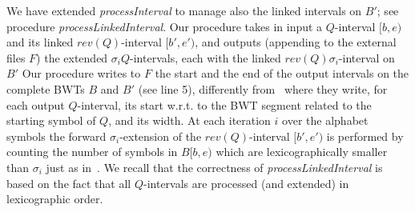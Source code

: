 \documentclass[runningheads,envcountsame,a4paper]{llncs}
\newcommand{\notaestesa}[2]{%
 \marginpar{\color{red!75!black}\textbf{\texttimes}}%
 {\color{red!75!black}%
 [\,\textbullet\,\textsf{\textbf{#1:}} %
 \textsf{\footnotesize#2}\,\textbullet\,]}%
}
\newcommand{\wrt}{w.r.t.\xspace}
\begin{document}
We have extended \emph{processInterval} to manage also the linked intervals on
$B'$; see procedure \emph{processLinkedInterval}.
Our procedure takes in input a $Q$-interval $[b,e)$ and its linked
$rev(Q)$-interval $[b',e')$, and outputs (appending to the external files $F$)
the extended $\sigma_i Q$-intervals, each  with the linked $rev(Q)
\sigma_i$-interval on $B'$
Our procedure writes to $F$ the start and the end of the output intervals on the
complete BWTs $B$ and $B'$ (see line 5), differently from~\cite{Cox2012} where they write, for each output $Q$-interval, its start \wrt to the BWT segment related to the starting symbol of $Q$, and its width.
At each iteration $i$ over the alphabet symbols the forward $\sigma_i$-extension
of the $rev(Q)$-interval $[b',e')$ is performed by counting
the number of symbols in $B[b,e)$ which are lexicographically smaller than
$\sigma_i$ just as in~\cite{Simpson2010}.
We recall that the correctness of \emph{processLinkedInterval} is based on the
fact that all $Q$-intervals are processed (and extended) in lexicographic order.








\begin{comment}
More precisely, the steps .... in algorithm \emph{processLinkedInterval}
directly provides the values of the new $\sigma Q$-interval and such
value is appended at the end of the new updated list (or file), in order
to maintain the lexicographic ordering.
In fact, the sorted property of the file, allows to update the files
while reading the files themselves, thus minimizing the operations on the
file.
\notaestesa{PB}{nota bene il passo dal 3 al 9 non si capisce come sia
implementato in termini di memoria esterna ed interna - io sarei per
descrivere la procedura processLinkedInterval- dettagliandola rispetto
ai linked intervals, che però vanno definiti prima, in termini
costruttivi}.


Intervals $[b,e)$ in $\mathcal{Q}_j$ represent common strings $Q$ of
length $(j+\tau)$.
Their link to the $rev(Q)$-interval $[b',e')$ on $B'$ is easily
maintained (during the backward extension of the intervals of length
$(j+\tau-1)$ to produce the intervals in $Q_j$) by Prop.~\ref{proposition:linked-intervals}.
This list is partioned into $|\Sigma|$ files according to the starting
symbol of $Q$, and maintained sorted by ascending value of the start
$b$.
\end{comment}
\end{document}
